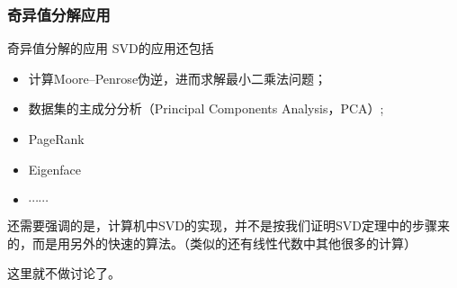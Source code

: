 
\begin{frame}
\frametitle{奇异值分解应用}

\begin{block}{奇异值分解的应用}
SVD的应用还包括
\begin{itemize}
\item 计算Moore–Penrose伪逆，进而求解最小二乘法问题；
\item 数据集的主成分分析（Principal Components Analysis，PCA）;
\item PageRank
\item Eigenface
\item $\cdots\cdots$
\end{itemize}
\end{block}

\vspace{1em}
\pause

还需要强调的是，计算机中SVD的实现，并不是按我们证明SVD定理中的步骤来的，而是用另外的快速的算法。（类似的还有线性代数中其他很多的计算）

这里就不做讨论了。

\end{frame}



